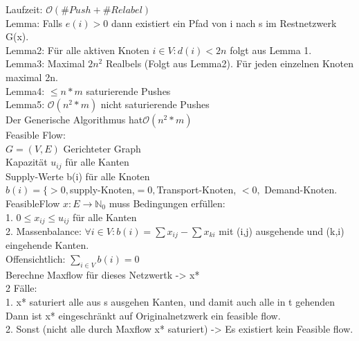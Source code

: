 \documentclass[a4paper]{article}
\newcommand{\oh}[1]{$\mathcal{O}(#1)$}
\begin{document}
Laufzeit: \oh{\#Push+\#Relabel}\\
Lemma: Falls $e(i)>0$ dann existiert ein Pfad von i nach s im Restnetzwerk G(x).\\
Lemma2: Für alle aktiven Knoten $i\in V: d(i)<2n$ folgt aus Lemma 1.\\
Lemma3: Maximal $2n^2$ Realbels (Folgt aus Lemma2). Für jeden einzelnen Knoten maximal 2n.\\
Lemma4: $\leq n*m$ saturierende Pushes\\
Lemma5: \oh{n^2*m} nicht saturierende Pushes\\
Der Generische Algorithmus hat\oh{n^2*m}\\

Feasible Flow:\\
$G=(V,E)$ Gerichteter Graph\\
Kapazität $u_{ij}$ für alle Kanten\\
Supply-Werte b(i) für alle Knoten\\
$b(i)=\lbrace >0, $supply-Knoten,$=0, $Transport-Knoten, $<0,$ Demand-Knoten.\\
FeasibleFlow $x:E\rightarrow\mathbb{N}_0$ muss Bedingungen erfüllen:\\
1. $0\leq x_{ij} \leq u_{ij}$ für alle Kanten\\
2. Massenbalance: $\forall i\in V: b(i)=\sum x_{ij} - \sum x_{ki}$ mit (i,j) ausgehende und (k,i) eingehende Kanten.\\
Offensichtlich: $\sum_{i\in V} b(i) = 0$\\
Berechne Maxflow für dieses Netzwertk -> x*\\
2 Fälle:\\
1. x* saturiert alle aus s ausgehen Kanten, und damit auch alle in t gehenden\\
Dann ist x* eingeschränkt auf Originalnetzwerk ein feasible flow.\\
2. Sonst (nicht alle durch Maxflow x* saturiert) -> Es existiert kein Feasible flow.
\end{document}
